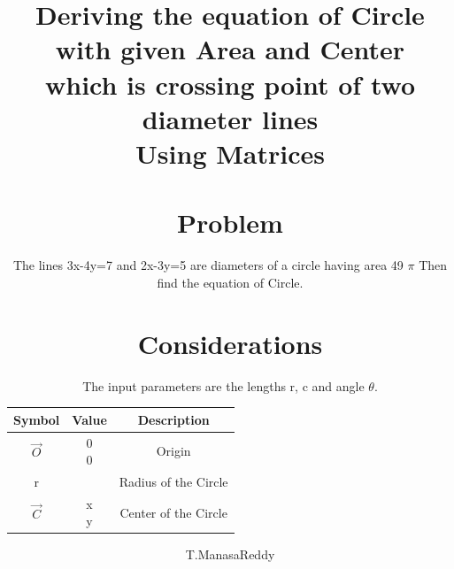 \documentclass[journal,10pt,twocolumn]{article}
\begin{document}
\title{
{Deriving the equation of Circle with given Area and Center \\
which is crossing point of two diameter lines\\
Using Matrices}\\
\author{T.ManasaReddy}
\maketitle
\tableofcontents
\section{Problem}
The lines 3x-4y=7 and 2x-3y=5 are diameters of a circle having area 49 $\pi$ Then find the equation of Circle.
\section{Considerations}
\vspace{0.2cm}
The input parameters are the lengths r, c and angle $\theta$. \\
\vspace{0.2cm}
{
\setlength\extrarowheight{2pt}
\begin{tabular}{|c|c|c|}
	\hline
	\textbf{Symbol}&\textbf{Value}&\textbf{Description}\\
	\hline
	$\vec{O}$ & \myvec{0\\0}
	&Origin\\
	\hline
	r&  & Radius of the Circle\\
	\hline
	$\vec{C}$ & \myvec{x \\ y}
	&Center of the Circle
	\\
\hline
\end{tabular}
}
}
\end{document}
